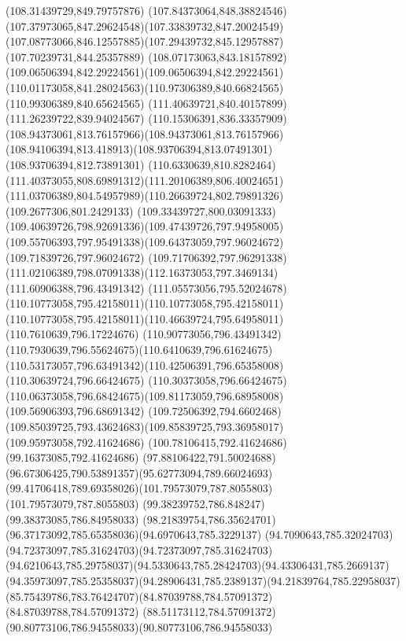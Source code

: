 {{		\lineto(108.31439729,849.79757876)
		\curveto(107.84373064,848.38824546)(107.37973065,847.29624548)(107.33839732,847.20024549)
		\curveto(107.08773066,846.12557885)(107.29439732,845.12957887)(107.70239731,844.25357889)
		\curveto(108.07173063,843.18157892)(109.06506394,842.29224561)(109.06506394,842.29224561)
		\curveto(110.01173058,841.28024563)(110.97306389,840.66824565)(110.99306389,840.65624565)
		\lineto(111.40639721,840.40157899)
		\lineto(111.26239722,839.94024567)
		\curveto(110.15306391,836.33357909)(108.94373061,813.76157966)(108.94373061,813.76157966)
		\curveto(108.94106394,813.418913)(108.93706394,813.07491301)(108.93706394,812.73891301)
		\curveto(110.6330639,810.8282464)(111.40373055,808.69891312)(111.20106389,806.40024651)
		\curveto(111.03706389,804.54957989)(110.26639724,802.79891326)(109.2677306,801.2429133)
		\curveto(109.33439727,800.03091333)(109.40639726,798.92691336)(109.47439726,797.94958005)
		\curveto(109.55706393,797.95491338)(109.64373059,797.96024672)(109.71839726,797.96024672)
		\lineto(109.71706392,797.96291338)
		\curveto(111.02106389,798.07091338)(112.16373053,797.3469134)(111.60906388,796.43491342)
		\curveto(111.05573056,795.52024678)(110.10773058,795.42158011)(110.10773058,795.42158011)
		\curveto(110.10773058,795.42158011)(110.46639724,795.64958011)(110.7610639,796.17224676)
		\curveto(110.90773056,796.43491342)(110.7930639,796.55624675)(110.6410639,796.61624675)
		\curveto(110.53173057,796.63491342)(110.42506391,796.65358008)(110.30639724,796.66424675)
		\lineto(110.30373058,796.66424675)
		\curveto(110.06373058,796.68424675)(109.81173059,796.68958008)(109.56906393,796.68691342)
		\curveto(109.72506392,794.6602468)(109.85039725,793.43624683)(109.85839725,793.36958017)
		\lineto(109.95973058,792.41624686)
		\lineto(100.78106415,792.41624686)
		\lineto(99.16373085,792.41624686)
		\curveto(97.88106422,791.50024688)(96.67306425,790.53891357)(95.62773094,789.66024693)
		\curveto(99.41706418,789.69358026)(101.79573079,787.8055803)(101.79573079,787.8055803)
		\lineto(99.38239752,786.848247)
		\lineto(99.38373085,786.84958033)
		\curveto(98.21839754,786.35624701)(96.37173092,785.65358036)(94.6970643,785.3229137)
		\curveto(94.7090643,785.32024703)(94.72373097,785.31624703)(94.72373097,785.31624703)
		\curveto(94.6210643,785.29758037)(94.5330643,785.28424703)(94.43306431,785.2669137)
		\curveto(94.35973097,785.25358037)(94.28906431,785.2389137)(94.21839764,785.22958037)
		\curveto(85.75439786,783.76424707)(84.87039788,784.57091372)(84.87039788,784.57091372)
		\curveto(88.51173112,784.57091372)(90.80773106,786.94558033)(90.80773106,786.94558033)
}}
